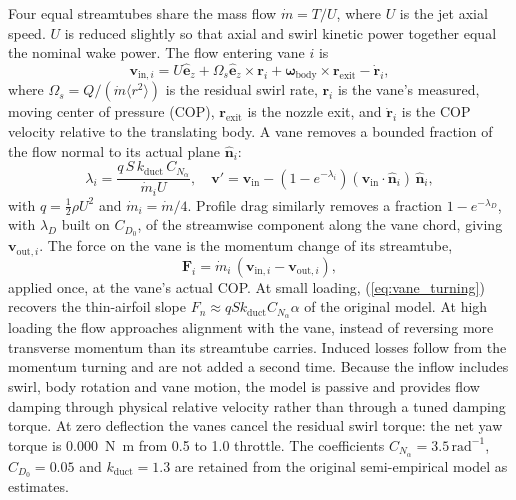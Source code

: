 \documentclass[conference]{IEEEtran}
\begin{document}
Four equal streamtubes share the mass flow $\dot{m} = T/U$, where $U$ is the jet axial speed. $U$ is reduced slightly so that axial and swirl kinetic power together equal the nominal wake power. The flow entering vane $i$ is
\begin{equation}
\mathbf{v}_{\text{in},i} = U\hat{\mathbf{e}}_z + \Omega_s\hat{\mathbf{e}}_z\times\mathbf{r}_i + \boldsymbol{\omega}_{\text{body}}\times\mathbf{r}_{\text{exit}} - \dot{\mathbf{r}}_i,
\label{eq:vane_inflow}
\end{equation}
where $\Omega_s = Q/(\dot{m}\langle r^2\rangle)$ is the residual swirl rate, $\mathbf{r}_i$ is the vane's measured, moving center of pressure (COP), $\mathbf{r}_{\text{exit}}$ is the nozzle exit, and $\dot{\mathbf{r}}_i$ is the COP velocity relative to the translating body. A vane removes a bounded fraction of the flow normal to its actual plane $\hat{\mathbf{n}}_i$:
\begin{equation}
\lambda_i = \frac{q\,S\,k_{\text{duct}}\,C_{N_\alpha}}{\dot{m}_i U}, \quad
\mathbf{v}' = \mathbf{v}_{\text{in}} - \left(1 - e^{-\lambda_i}\right)(\mathbf{v}_{\text{in}}\cdot\hat{\mathbf{n}}_i)\,\hat{\mathbf{n}}_i ,
\label{eq:vane_turning}
\end{equation}
with $q = \tfrac{1}{2}\rho U^2$ and $\dot{m}_i = \dot{m}/4$. Profile drag similarly removes a fraction $1 - e^{-\lambda_D}$, with $\lambda_D$ built on $C_{D_0}$, of the streamwise component along the vane chord, giving $\mathbf{v}_{\text{out},i}$. The force on the vane is the momentum change of its streamtube,
\begin{equation}
\mathbf{F}_i = \dot{m}_i\,(\mathbf{v}_{\text{in},i} - \mathbf{v}_{\text{out},i}),
\label{eq:vane_force}
\end{equation}
applied once, at the vane's actual COP. At small loading, (\ref{eq:vane_turning}) recovers the thin-airfoil slope $F_n \approx q S k_{\text{duct}} C_{N_\alpha}\alpha$ of the original model. At high loading the flow approaches alignment with the vane, instead of reversing more transverse momentum than its streamtube carries. Induced losses follow from the momentum turning and are not added a second time. Because the inflow includes swirl, body rotation and vane motion, the model is passive and provides flow damping through physical relative velocity rather than through a tuned damping torque. At zero deflection the vanes cancel the residual swirl torque: the net yaw torque is \SI{0.000}{\newton\metre} from 0.5 to 1.0 throttle. The coefficients $C_{N_\alpha} = 3.5\,\text{rad}^{-1}$, $C_{D_0} = 0.05$ and $k_{\text{duct}} = 1.3$ are retained from the original semi-empirical model as estimates.
\end{document}
